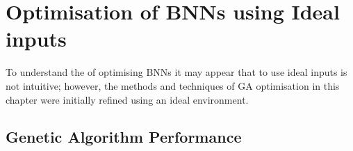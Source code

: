 \section{Optimisation of BNNs using Ideal inputs}

To understand the of optimising BNNs it may appear that to use ideal
inputs is not intuitive; however, the methods and techniques of GA
optimisation in this chapter were initially refined using an ideal
environment.

\subsection{Genetic Algorithm Performance}


% 
% 
% 
% 
% 
% 
% 
% 
% 






